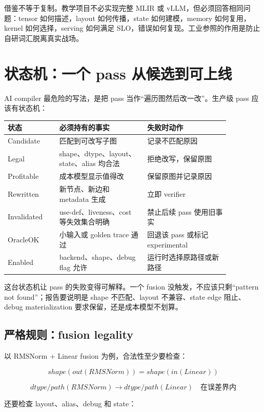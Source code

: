 借鉴不等于复制。教学项目不必实现完整 MLIR 或 vLLM，但必须回答相同问题：tensor 如何描述，layout 如何传播，state 如何建模，memory 如何复用，kernel 如何选择，serving 如何满足 SLO，错误如何复现。工业参照的作用是防止自研词汇脱离真实战场。

\section{状态机：一个 pass 从候选到可上线}

AI compiler 最危险的写法，是把 pass 当作“遍历图然后改一改”。生产级 pass 应该有状态机：

\begin{center}
\begin{tabular}{p{0.20\linewidth}p{0.34\linewidth}p{0.32\linewidth}}
\toprule
状态 & 必须持有的事实 & 失败时动作 \\
\midrule
Candidate & 匹配到可改写子图 & 记录不匹配原因 \\
Legal & shape、dtype、layout、state、alias 均合法 & 拒绝改写，保留原图 \\
Profitable & 成本模型显示值得改 & 保留原图并记录原因 \\
Rewritten & 新节点、新边和 metadata 生成 & 立即 verifier \\
Invalidated & use-def、liveness、cost 等失效集合明确 & 禁止后续 pass 使用旧事实 \\
OracleOK & 小输入或 golden trace 通过 & 回退该 pass 或标记 experimental \\
Enabled & backend、shape、debug flag 允许 & 运行时选择原路径或新路径 \\
\bottomrule
\end{tabular}
\end{center}

这台状态机让 pass 的失败变得可解释。一个 fusion 没触发，不应该只剩“pattern not found”；报告要说明是 shape 不匹配、layout 不兼容、state edge 阻止、debug materialization 要求保留，还是成本模型不划算。

\subsection{严格规则：fusion legality}

以 RMSNorm + Linear fusion 为例，合法性至少要检查：

\[
shape(out(RMSNorm)) = shape(in(Linear))
\]

\[
dtype/path(RMSNorm) \rightarrow dtype/path(Linear)\quad \text{在误差界内}
\]

还要检查 layout、alias、debug 和 state：

